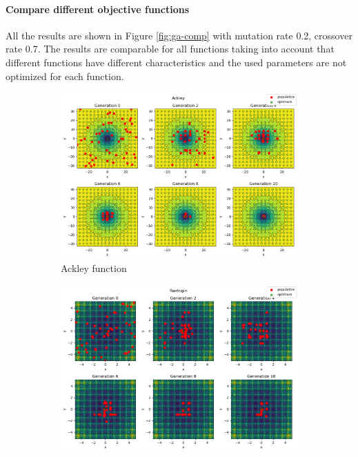 \paragraph*{Compare different objective functions}
All the results are shown in Figure \ref{fig:ga-comp} with mutation rate 0.2, crossover rate 0.7. The results are comparable for all functions taking into account that different functions have different characteristics and the used parameters are not optimized for each function.
\begin{figure}[H]
    \begin{subfigure}{0.5\textwidth}
        \includegraphics[width=\textwidth]{lab7/imgs/ga_ackley.png}
        \caption{Ackley function}
    \end{subfigure}
    \begin{subfigure}{0.5\textwidth}
        \includegraphics[width=\textwidth]{lab7/imgs/ga_rastrigin.png}

\end{subfigure}
\end{figure}

